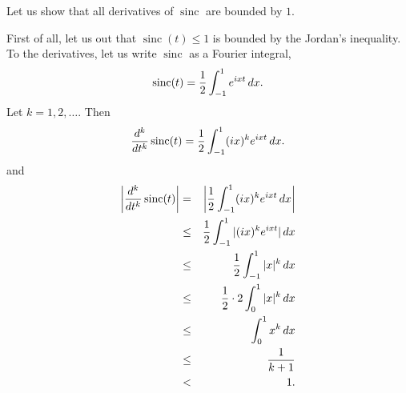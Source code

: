 \documentclass[12pt]{article}
\begin{document}
Let us show that all derivatives of $\operatorname{sinc}$ are bounded by $1$. 

First of all, let us  out that $\operatorname{sinc}(t)\le 1$ is 
bounded by the Jordan's inequality. To  the derivatives, let 
us write $\operatorname{sinc}$ as a Fourier integral,
$$
  \operatorname{sinc}(t) = {1\over 2} \int_{-1}^1 e^{ixt} \, dx.
$$
Let $k=1,2,\ldots$. Then
$$
{d^k\over dt^k} \operatorname{sinc}(t) = {1\over 2} \int_{-1}^1 (ix)^k e^{ixt} \, dx.
$$
and
\begin{eqnarray*}
\left\vert {d^k\over dt^k} \operatorname{sinc}(t) \right\vert &=& \left\vert {1\over 2} \int_{-1}^1 (ix)^k e^{ixt} \, dx \right\vert \\
&\le& {1\over 2} \int_{-1}^1 \vert (ix)^k e^{ixt} \vert \, dx \\
&\le& {1\over 2} \int_{-1}^1 \vert x \vert^k \, dx \\
&\le& {1\over 2} \cdot 2 \int_0^1 \vert x \vert^k \, dx \\
&\le& \int_0^1  x^k  \, dx \\
&\le& \frac{1}{k+1} \\
&<& 1.
\end{eqnarray*}
\end{document}
